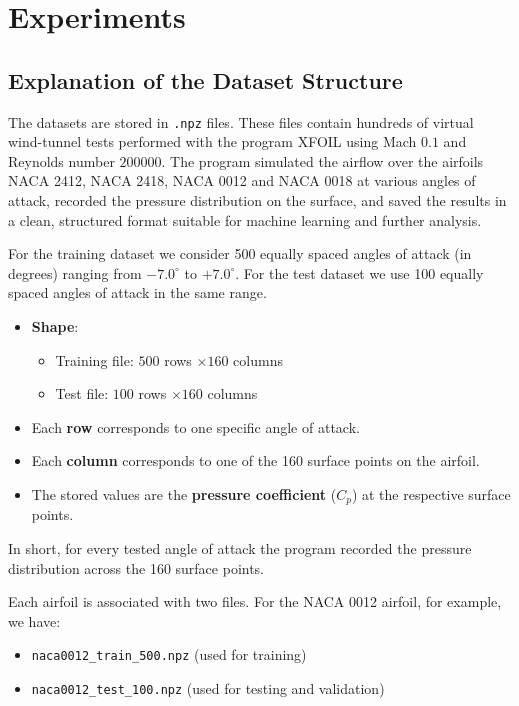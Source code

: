 \documentclass[12pt]{amsart}
\theoremstyle{plain}
\theoremstyle{definition}
\begin{document}
	
		
		
				\section{Experiments}
	\label{sec: exp}
	
	\subsection{Explanation of the Dataset Structure}
\label{sec:dataset}

The datasets are stored in \texttt{.npz} files. These files contain hundreds of virtual wind-tunnel tests performed with the program XFOIL \cite{Drela1989} using Mach $0.1$ and Reynolds number $200000$. The program simulated the airflow over the airfoils NACA 2412, NACA 2418, NACA 0012 and NACA 0018 at various angles of attack, recorded the pressure distribution on the surface, and saved the results in a clean, structured format suitable for machine learning and further analysis.

For the training dataset we consider 500 equally spaced angles of attack (in degrees) ranging from \(-7.0^\circ\) to \(+7.0^\circ\). For the test dataset we use 100 equally spaced angles of attack in the same range.

\begin{itemize}
    \item \textbf{Shape}:
    \begin{itemize}
        \item Training file: \(500\) rows \(\times 160\) columns
        \item Test file: \(100\) rows \(\times 160\) columns
    \end{itemize}
    \item Each \textbf{row} corresponds to one specific angle of attack.
    \item Each \textbf{column} corresponds to one of the 160 surface points on the airfoil.
    \item The stored values are the \textbf{pressure coefficient} (\(C_p\)) at the respective surface points.
\end{itemize}

In short, for every tested angle of attack the program recorded the pressure distribution across the 160 surface points.

Each airfoil is associated with two files. For the NACA 0012 airfoil, for example, we have:
\begin{itemize}
    \item \texttt{naca0012\_train\_500.npz} (used for training)
    \item \texttt{naca0012\_test\_100.npz} (used for testing and validation)
\end{itemize}
\end{document}
